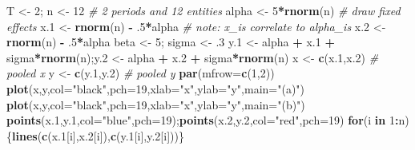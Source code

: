 \documentclass[
  12pt,
]{book}
\newenvironment{Shaded}{\begin{snugshade}}{\end{snugshade}}
\newcommand{\AttributeTok}[1]{\textcolor[rgb]{0.13,0.29,0.53}{#1}}
\newcommand{\CommentTok}[1]{\textcolor[rgb]{0.56,0.35,0.01}{\textit{#1}}}
\newcommand{\ControlFlowTok}[1]{\textcolor[rgb]{0.13,0.29,0.53}{\textbf{#1}}}
\newcommand{\DecValTok}[1]{\textcolor[rgb]{0.00,0.00,0.81}{#1}}
\newcommand{\FloatTok}[1]{\textcolor[rgb]{0.00,0.00,0.81}{#1}}
\newcommand{\FunctionTok}[1]{\textcolor[rgb]{0.13,0.29,0.53}{\textbf{#1}}}
\newcommand{\NormalTok}[1]{#1}
\newcommand{\OtherTok}[1]{\textcolor[rgb]{0.56,0.35,0.01}{#1}}
\newcommand{\SpecialCharTok}[1]{\textcolor[rgb]{0.81,0.36,0.00}{\textbf{#1}}}
\newcommand{\StringTok}[1]{\textcolor[rgb]{0.31,0.60,0.02}{#1}}
\theoremstyle{definition}
\theoremstyle{definition}
\theoremstyle{definition}
\theoremstyle{definition}
\theoremstyle{remark}
\begin{document}
\begin{Shaded}
\begin{Highlighting}[]
\NormalTok{T }\OtherTok{\textless{}{-}} \DecValTok{2}\NormalTok{; n }\OtherTok{\textless{}{-}} \DecValTok{12} \CommentTok{\# 2 periods and 12 entities}
\NormalTok{alpha }\OtherTok{\textless{}{-}} \DecValTok{5}\SpecialCharTok{*}\FunctionTok{rnorm}\NormalTok{(n) }\CommentTok{\# draw fixed effects}
\NormalTok{x}\FloatTok{.1} \OtherTok{\textless{}{-}} \FunctionTok{rnorm}\NormalTok{(n) }\SpecialCharTok{{-}}\NormalTok{ .}\DecValTok{5}\SpecialCharTok{*}\NormalTok{alpha }\CommentTok{\# note: x\_i\textquotesingle{}s correlate to alpha\_i\textquotesingle{}s}
\NormalTok{x}\FloatTok{.2} \OtherTok{\textless{}{-}} \FunctionTok{rnorm}\NormalTok{(n) }\SpecialCharTok{{-}}\NormalTok{ .}\DecValTok{5}\SpecialCharTok{*}\NormalTok{alpha}
\NormalTok{beta }\OtherTok{\textless{}{-}} \DecValTok{5}\NormalTok{; sigma }\OtherTok{\textless{}{-}}\NormalTok{ .}\DecValTok{3}
\NormalTok{y}\FloatTok{.1} \OtherTok{\textless{}{-}}\NormalTok{ alpha }\SpecialCharTok{+}\NormalTok{ x}\FloatTok{.1} \SpecialCharTok{+}\NormalTok{ sigma}\SpecialCharTok{*}\FunctionTok{rnorm}\NormalTok{(n);y}\FloatTok{.2} \OtherTok{\textless{}{-}}\NormalTok{ alpha }\SpecialCharTok{+}\NormalTok{ x}\FloatTok{.2} \SpecialCharTok{+}\NormalTok{ sigma}\SpecialCharTok{*}\FunctionTok{rnorm}\NormalTok{(n)}
\NormalTok{x }\OtherTok{\textless{}{-}} \FunctionTok{c}\NormalTok{(x}\FloatTok{.1}\NormalTok{,x}\FloatTok{.2}\NormalTok{) }\CommentTok{\# pooled x}
\NormalTok{y }\OtherTok{\textless{}{-}} \FunctionTok{c}\NormalTok{(y}\FloatTok{.1}\NormalTok{,y}\FloatTok{.2}\NormalTok{) }\CommentTok{\# pooled y}
\FunctionTok{par}\NormalTok{(}\AttributeTok{mfrow=}\FunctionTok{c}\NormalTok{(}\DecValTok{1}\NormalTok{,}\DecValTok{2}\NormalTok{))}
\FunctionTok{plot}\NormalTok{(x,y,}\AttributeTok{col=}\StringTok{"black"}\NormalTok{,}\AttributeTok{pch=}\DecValTok{19}\NormalTok{,}\AttributeTok{xlab=}\StringTok{"x"}\NormalTok{,}\AttributeTok{ylab=}\StringTok{"y"}\NormalTok{,}\AttributeTok{main=}\StringTok{"(a)"}\NormalTok{)}
\FunctionTok{plot}\NormalTok{(x,y,}\AttributeTok{col=}\StringTok{"black"}\NormalTok{,}\AttributeTok{pch=}\DecValTok{19}\NormalTok{,}\AttributeTok{xlab=}\StringTok{"x"}\NormalTok{,}\AttributeTok{ylab=}\StringTok{"y"}\NormalTok{,}\AttributeTok{main=}\StringTok{"(b)"}\NormalTok{)}
\FunctionTok{points}\NormalTok{(x}\FloatTok{.1}\NormalTok{,y}\FloatTok{.1}\NormalTok{,}\AttributeTok{col=}\StringTok{"blue"}\NormalTok{,}\AttributeTok{pch=}\DecValTok{19}\NormalTok{);}\FunctionTok{points}\NormalTok{(x}\FloatTok{.2}\NormalTok{,y}\FloatTok{.2}\NormalTok{,}\AttributeTok{col=}\StringTok{"red"}\NormalTok{,}\AttributeTok{pch=}\DecValTok{19}\NormalTok{)}
\ControlFlowTok{for}\NormalTok{(i }\ControlFlowTok{in} \DecValTok{1}\SpecialCharTok{:}\NormalTok{n)\{}\FunctionTok{lines}\NormalTok{(}\FunctionTok{c}\NormalTok{(x}\FloatTok{.1}\NormalTok{[i],x}\FloatTok{.2}\NormalTok{[i]),}\FunctionTok{c}\NormalTok{(y}\FloatTok{.1}\NormalTok{[i],y}\FloatTok{.2}\NormalTok{[i]))\}}
\end{Highlighting}
\end{Shaded}
\end{document}
